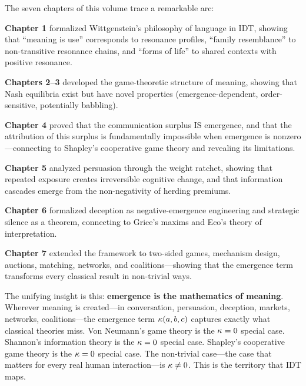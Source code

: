 \begin{interpretation}
The seven chapters of this volume trace a remarkable arc:

\textbf{Chapter 1} formalized Wittgenstein's philosophy of language
in IDT, showing that ``meaning is use'' corresponds to resonance profiles,
``family resemblance'' to non-transitive resonance chains, and ``forms
of life'' to shared contexts with positive resonance.

\textbf{Chapters 2--3} developed the game-theoretic structure of meaning,
showing that Nash equilibria exist but have novel properties
(emergence-dependent, order-sensitive, potentially babbling).

\textbf{Chapter 4} proved that the communication surplus IS emergence,
and that the attribution of this surplus is fundamentally impossible
when emergence is nonzero---connecting to Shapley's cooperative game
theory and revealing its limitations.

\textbf{Chapter 5} analyzed persuasion through the weight ratchet,
showing that repeated exposure creates irreversible cognitive change,
and that information cascades emerge from the non-negativity of herding
premiums.

\textbf{Chapter 6} formalized deception as negative-emergence engineering
and strategic silence as a theorem, connecting to Grice's maxims and
Eco's theory of interpretation.

\textbf{Chapter 7} extended the framework to two-sided games, mechanism
design, auctions, matching, networks, and coalitions---showing that the
emergence term transforms every classical result in non-trivial ways.

The unifying insight is this: \textbf{emergence is the mathematics of
meaning}. Wherever meaning is created---in conversation, persuasion,
deception, markets, networks, coalitions---the emergence term
$\kappa(a, b, c)$ captures exactly what classical theories miss.
Von Neumann's game theory is the $\kappa = 0$ special case.
Shannon's information theory is the $\kappa = 0$ special case.
Shapley's cooperative game theory is the $\kappa = 0$ special case.
The non-trivial case---the case that matters for every real human
interaction---is $\kappa \neq 0$. This is the territory that IDT maps.
\end{interpretation}

